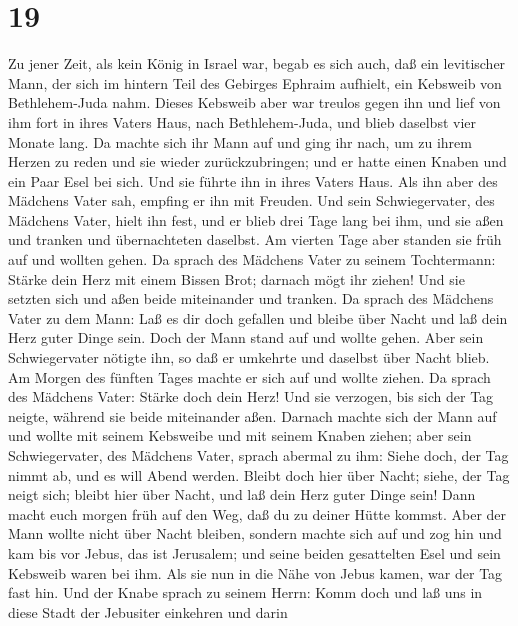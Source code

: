\hypertarget{section-18}{%
\section{19}\label{section-18}}

 Zu jener Zeit, als kein König in Israel war, begab es
sich auch, daß ein levitischer Mann, der sich im hintern Teil des
Gebirges Ephraim aufhielt, ein Kebsweib von Bethlehem-Juda nahm.
 Dieses Kebsweib aber war treulos gegen ihn und lief von
ihm fort in ihres Vaters Haus, nach Bethlehem-Juda, und blieb daselbst
vier Monate lang.  Da machte sich ihr Mann auf und ging
ihr nach, um zu ihrem Herzen zu reden und sie wieder zurückzubringen;
und er hatte einen Knaben und ein Paar Esel bei sich. Und sie führte ihn
in ihres Vaters Haus. Als ihn aber des Mädchens Vater sah, empfing er
ihn mit Freuden.  Und sein Schwiegervater, des Mädchens
Vater, hielt ihn fest, und er blieb drei Tage lang bei ihm, und sie aßen
und tranken und übernachteten daselbst.  Am vierten Tage
aber standen sie früh auf und wollten gehen. Da sprach des Mädchens
Vater zu seinem Tochtermann: Stärke dein Herz mit einem Bissen Brot;
darnach mögt ihr ziehen!  Und sie setzten sich und aßen
beide miteinander und tranken. Da sprach des Mädchens Vater zu dem Mann:
Laß es dir doch gefallen und bleibe über Nacht und laß dein Herz guter
Dinge sein.  Doch der Mann stand auf und wollte gehen.
Aber sein Schwiegervater nötigte ihn, so daß er umkehrte und daselbst
über Nacht blieb.  Am Morgen des fünften Tages machte er
sich auf und wollte ziehen. Da sprach des Mädchens Vater: Stärke doch
dein Herz! Und sie verzogen, bis sich der Tag neigte, während sie beide
miteinander aßen.  Darnach machte sich der Mann auf und
wollte mit seinem Kebsweibe und mit seinem Knaben ziehen; aber sein
Schwiegervater, des Mädchens Vater, sprach abermal zu ihm: Siehe doch,
der Tag nimmt ab, und es will Abend werden. Bleibt doch hier über Nacht;
siehe, der Tag neigt sich; bleibt hier über Nacht, und laß dein Herz
guter Dinge sein! Dann macht euch morgen früh auf den Weg, daß du zu
deiner Hütte kommst.  Aber der Mann wollte nicht über
Nacht bleiben, sondern machte sich auf und zog hin und kam bis vor
Jebus, das ist Jerusalem; und seine beiden gesattelten Esel und sein
Kebsweib waren bei ihm.  Als sie nun in die Nähe von
Jebus kamen, war der Tag fast hin. Und der Knabe sprach zu seinem Herrn:
Komm doch und laß uns in diese Stadt der Jebusiter einkehren und darin
